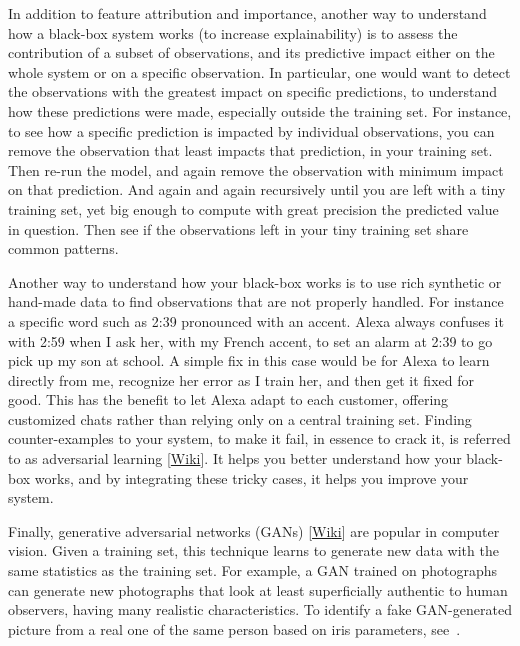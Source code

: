 \documentclass[oneside,10pt]{book}
\begin{document}
In addition to feature attribution and importance, another way to understand how a black-box system works (to increase explainability) is to assess the contribution of 
a subset of observations, and its predictive impact either on the whole system or on a specific observation. In particular, one would want to detect the observations with the greatest impact on specific predictions, to understand how these predictions were made, especially outside the training set. For instance, to see how a specific prediction is impacted by individual observations, 
you can remove the observation that least impacts that prediction, in your training set. Then re-run the model, and again remove the observation with minimum impact on that prediction.
 And again and again recursively until you are left with a tiny training set, yet big enough to compute with great precision the predicted value in question. Then see if the observations left in your tiny training set share common patterns.

 Another way to understand how your black-box works is to use rich synthetic or hand-made data to find observations that are not properly handled. For instance
 a specific word such as 2:39 pronounced with an accent. Alexa always confuses it with 2:59 when I ask her, with my French accent, to set an alarm at 2:39 to go pick up my son at school. A simple fix in this case would be for Alexa to learn directly from me, recognize her error as I train her, and then get it fixed for good. This has the benefit to let Alexa adapt to each customer, offering customized chats rather than relying only on a central training set. Finding counter-examples to your system, to make it fail, in essence to crack it, is referred to as \textcolor{index}{adversarial learning} [\href{https://en.wikipedia.org/wiki/Adversarial_machine_learning}{Wiki}]. It helps you better understand how your black-box works, and by integrating these tricky cases, it helps you improve your system.

Finally, \textcolor{index}{generative adversarial networks} (GANs) [\href{https://en.wikipedia.org/wiki/Generative_adversarial_network}{Wiki}] are popular in computer vision. Given a training set, this technique learns to generate new data with the same statistics as the training set. For example, a GAN trained on photographs can generate new photographs that look at least superficially authentic to human observers, having many realistic characteristics. 
To identify a fake GAN-generated picture from a real one of the same person based on iris parameters, see~\cite{gan2021}. 
\end{document}
